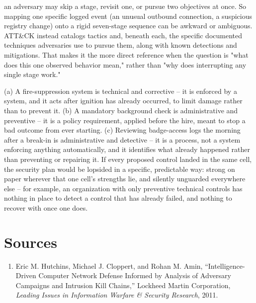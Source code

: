 \begin{answerkey}
an adversary may skip a stage, revisit one, or pursue two objectives at once. So mapping one
specific logged event (an unusual outbound connection, a suspicious registry change) onto a rigid
seven-stage sequence can be awkward or ambiguous. ATT\&CK instead catalogs tactics and, beneath
each, the specific documented techniques adversaries use to pursue them, along with known
detections and mitigations. That makes it the more direct reference when the question is "what
does this one observed behavior mean," rather than "why does interrupting any single stage work."
\item (a) A fire-suppression system is technical and corrective -- it is enforced by a system, and
it acts after ignition has already occurred, to limit damage rather than to prevent it. (b) A
mandatory background check is administrative and preventive -- it is a policy requirement, applied
before the hire, meant to stop a bad outcome from ever starting. (c) Reviewing badge-access logs
the morning after a break-in is administrative and detective -- it is a process, not a system
enforcing anything automatically, and it identifies what already happened rather than preventing
or repairing it. If every proposed control landed in the same cell, the security plan would be
lopsided in a specific, predictable way: strong on paper wherever that one cell's strengths lie,
and silently unguarded everywhere else -- for example, an organization with only preventive
technical controls has nothing in place to detect a control that has already failed, and nothing
to recover with once one does.
\end{answerkey}

\section*{Sources}
\begin{enumerate}[label=\lbrack\arabic*\rbrack, leftmargin=2.2em]
\item {}Eric M. Hutchins, Michael J. Cloppert, and Rohan M. Amin, ``Intelligence-Driven
Computer Network Defense Informed by Analysis of Adversary Campaigns and Intrusion Kill Chains,''
Lockheed Martin Corporation, \emph{Leading Issues in Information Warfare \& Security Research},
2011.
\end{enumerate}

